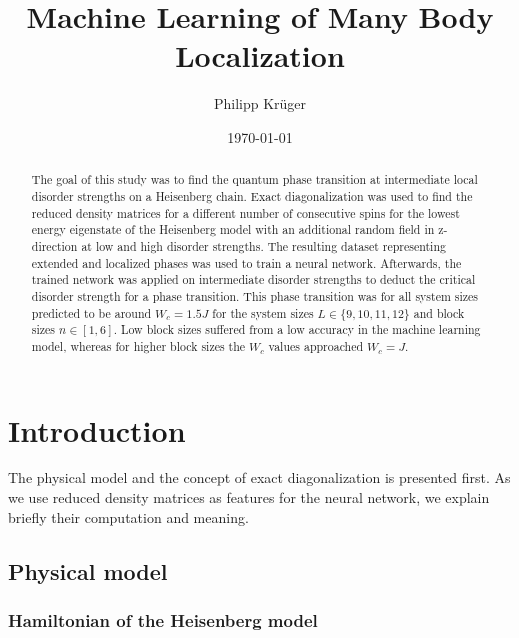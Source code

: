 \documentclass[reprint,amsmath,amssymb,aps,prb]{revtex4-2}
\begin{document}
%

\title{Machine Learning of Many Body Localization}

\author{Philipp Krüger}

\date{\today}%

\begin{abstract}
The goal of this study was to find the quantum phase transition at intermediate local disorder strengths on a Heisenberg chain. Exact diagonalization was used to find the reduced density matrices for a different number of consecutive spins for the lowest energy eigenstate of the Heisenberg model with an additional random field in z-direction at low and high disorder strengths. The resulting dataset representing extended and localized phases was used to train a neural network. Afterwards, the trained network was applied on intermediate disorder strengths to deduct the critical disorder strength for a phase transition. This phase transition was for all system sizes predicted to be around $W_c = 1.5 J$ for the system sizes $L\in\{9, 10, 11, 12\}$ and block sizes $n\in\left[1,6\right]$. Low block sizes suffered from a low accuracy in the machine learning model, whereas for higher block sizes the $W_c$ values approached $W_c=J$.  %
\end{abstract}

\maketitle

\section{Introduction}

The physical model and the concept of exact diagonalization is presented first. As we use reduced density matrices as features for the neural network, we explain briefly their computation and meaning.
\subsection{Physical model}

\subsubsection{Hamiltonian of the Heisenberg model}
\end{document}
